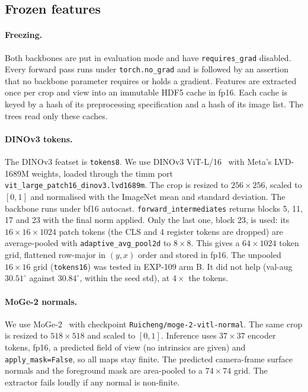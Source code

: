 \subsection{Frozen features}\label{app:features}

\paragraph{Freezing.}
Both backbones are put in evaluation mode and have \texttt{requires\_grad} disabled. Every forward pass runs under \texttt{torch.no\_grad} and is followed by an assertion that no backbone parameter requires or holds a gradient. Features are extracted once per crop and view into an immutable HDF5 cache in fp16. Each cache is keyed by a hash of its preprocessing specification and a hash of its image list. The trees read only these caches.

\paragraph{DINOv3 tokens.}
The DINOv3 featset is \texttt{tokens8}. We use DINOv3 ViT-L/16~\cite{simeoni2025dinov3} with Meta's LVD-1689M weights, loaded through the timm port \texttt{vit\_large\_patch16\_dinov3.lvd1689m}. The crop is resized to $256\times256$, scaled to $[0,1]$ and normalised with the ImageNet mean and standard deviation. The backbone runs under bf16 autocast. \texttt{forward\_intermediates} returns blocks 5, 11, 17 and 23 with the final norm applied. Only the last one, block 23, is used: its $16\times16\times1024$ patch tokens (the CLS and 4 register tokens are dropped) are average-pooled with \texttt{adaptive\_avg\_pool2d} to $8\times8$. This gives a $64\times1024$ token grid, flattened row-major in $(y,x)$ order and stored in fp16. The unpooled $16\times16$ grid (\texttt{tokens16}) was tested in EXP-109 arm B. It did not help (val-aug $30.51^\circ$ against $30.84^\circ$, within the seed std), at $4\times$ the tokens.

\paragraph{MoGe-2 normals.}
We use MoGe-2~\cite{wang2025moge2} with checkpoint \texttt{Ruicheng/moge-2-vitl-normal}. The same crop is resized to $518\times518$ and scaled to $[0,1]$. Inference uses $37\times37$ encoder tokens, fp16, a predicted field of view (no intrinsics are given) and \texttt{apply\_mask=False}, so all maps stay finite. The predicted camera-frame surface normals and the foreground mask are area-pooled to a $74\times74$ grid. The extractor fails loudly if any normal is non-finite.

